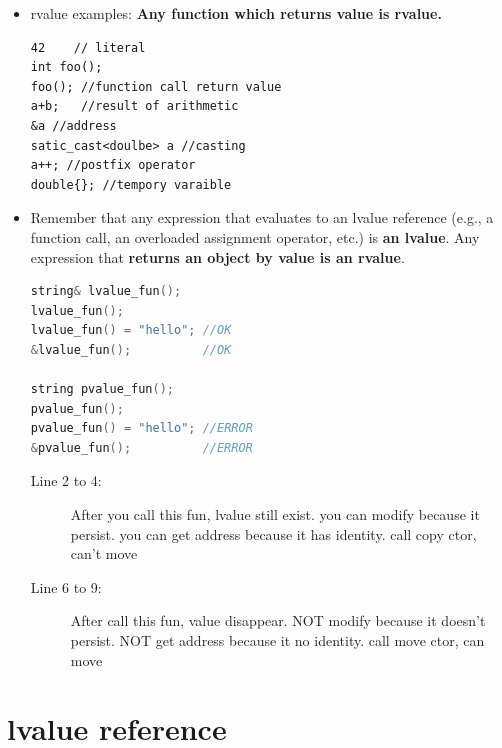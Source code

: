 \documentclass[a4paper,11pt,twoside]{book}
\begin{document}
\begin{itemize}
	
	\item rvalue examples: \textbf{Any function which returns value is rvalue.}
\begin{lstlisting}
42    // literal
int foo(); 
foo(); //function call return value
a+b;   //result of arithmetic
&a //address 
satic_cast<doulbe> a //casting
a++; //postfix operator
double{}; //tempory varaible
\end{lstlisting}

	\item Remember that any expression that evaluates to an lvalue reference (e.g., a function call, an overloaded assignment operator, etc.) is \textbf{an lvalue}. Any expression that \textbf{returns an object by value is an rvalue}.

\begin{lstlisting}[frame=single, language=c++, mathescape=true]
string& lvalue_fun();
lvalue_fun(); 
lvalue_fun() = "hello"; //OK
&lvalue_fun();          //OK
	
string pvalue_fun();
pvalue_fun(); 
pvalue_fun() = "hello"; //ERROR
&pvalue_fun();          //ERROR
\end{lstlisting}

\begin{description}
	\item[Line 2 to 4:] After you call this fun, lvalue still exist. you can modify because it persist. you can get address because it has identity. call copy ctor, can't move
	
	\item[Line 6 to 9:]  After call this fun, value disappear. NOT modify because it doesn't persist. NOT get address because it no identity. call move ctor, can move
\end{description}



\end{itemize}

\section{lvalue reference}
\end{document}
